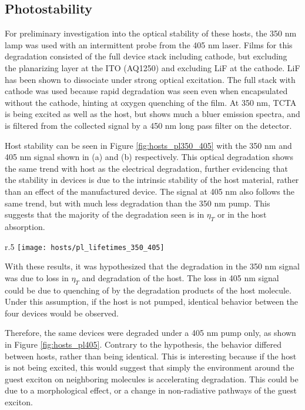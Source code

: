 \documentclass[../thesis.tex]{subfiles}
\begin{document}
\subsection{Photostability}\label{sec:hosts_stability}


For preliminary investigation into the optical stability of these hosts, the 350 nm lamp was used with an intermittent probe from the 405 nm laser.
Films for this degradation consisted of the full device stack including cathode, but excluding the planarizing layer at the ITO (AQ1250) and excluding LiF at the cathode.
LiF has been shown to dissociate under strong optical excitation.\supercite{Wang2011a}
The full stack with cathode was used because rapid degradation was seen even when encapsulated without the cathode, hinting at oxygen quenching of the film.
At 350 nm, TCTA is being excited as well as the host, but shows much a bluer emission spectra, and is filtered from the collected signal by a 450 nm long pass filter on the detector.


Host stability can be seen in Figure \ref{fig:hosts_pl350_405} with the 350 nm and 405 nm signal shown in (a) and (b) respectively.
This optical degradation shows the same trend with host as the electrical degradation, further evidencing that the stability in devices is due to the intrinsic stability of the host material, rather than an effect of the manufactured device.
The signal at 405 nm also follows the same trend, but with much less degradation than the 350 nm pump.
This suggests that the majority of the degradation seen is in $\eta_T$ or in the host absorption.

\begin{wrapfigure}{r}{.5\textwidth}
\centering
\texttt{[image: hosts/pl\_lifetimes\_350\_405]}
\caption{Photodegradation at 350 nm, with intermittent probe at 405 nm. }
\label{fig:hosts_pl350_405}
\end{wrapfigure}

With these results, it was hypothesized that the degradation in the 350 nm signal was due to loss in $\eta_T$ and degradation of the host.
The loss in 405 nm signal could be due to quenching of \irppy by the degradation products of the host molecule.
Under this assumption, if the host is not pumped, identical behavior between the four devices would be observed.


Therefore, the same devices were degraded under a 405 nm pump only, as shown in Figure \ref{fig:hosts_pl405}.
Contrary to the hypothesis, the behavior differed between hosts, rather than being identical.
This is interesting because if the host is not being excited, this would suggest that simply the environment around the guest exciton on neighboring molecules is accelerating degradation.
This could be due to a morphological effect, or a change in non-radiative pathways of the guest exciton.  
\end{document}
